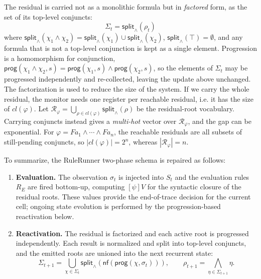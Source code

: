 The residual is carried not as a monolithic formula but in \emph{factored} form, as the set of its top-level conjuncts:
\[
    \Sigma_t = \mathsf{split}_\wedge(\rho_t)
\]
where $\mathsf{split}_\wedge(\chi_1\land\chi_2) = \mathsf{split}_\wedge(\chi_1)\cup\mathsf{split}_\wedge(\chi_2)$, $\mathsf{split}_\wedge(\top)=\emptyset$, and any formula that is not a top-level conjunction is kept as a single element. Progression is a homomorphism for conjunction, $\mathsf{prog}(\chi_1\land\chi_2,s) = \mathsf{prog}(\chi_1,s)\land\mathsf{prog}(\chi_2,s)$, so the elements of $\Sigma_t$ may be progressed independently and re-collected, leaving the update above unchanged. 
%
The factorization is used to reduce the size of the system. If we carry the whole residual, the monitor needs one register per reachable residual, i.e. it has the size of $cl(\varphi)$. Let $\mathcal R_\varphi=\bigcup_{\rho\in cl(\varphi)}\mathsf{split}_\wedge(\rho)$ be the residual-root vocabulary. Carrying conjuncts instead gives a \emph{multi-hot} vector over $\mathcal R_\varphi$, and the gap can be exponential. For $\varphi = F a_1 \land \cdots \land F a_n$, the reachable residuals are all subsets of still-pending conjuncts, so $|cl(\varphi)| = 2^n$, whereas $|\mathcal R_\varphi|=n$.

To summarize, the RuleRunner two-phase schema is repaired as follows:

\begin{enumerate}
    \item \textbf{Evaluation.}
    The observation $\sigma_t$ is injected into $S_t$ and the evaluation rules $R_E$ are fired bottom-up, computing $[\psi]V$ for the syntactic closure of the residual roots. These values provide the end-of-trace decision for the current cell; ongoing state evolution is performed by the progression-based reactivation below.
    \item \textbf{Reactivation.}
    The residual is factorized and each active root is progressed independently. Each result is normalized and split into top-level conjuncts, and the emitted roots are unioned into the next recurrent state:
    \[
        \Sigma_{t+1}
        = \bigcup_{\chi\in\Sigma_t}
          \mathsf{split}_\wedge\!\left(
             \mathsf{nf}(\mathsf{prog}(\chi,\sigma_t))
          \right),
        \qquad
        \rho_{t+1}=\bigwedge_{\eta\in\Sigma_{t+1}}\eta.
    \]
\end{enumerate}

